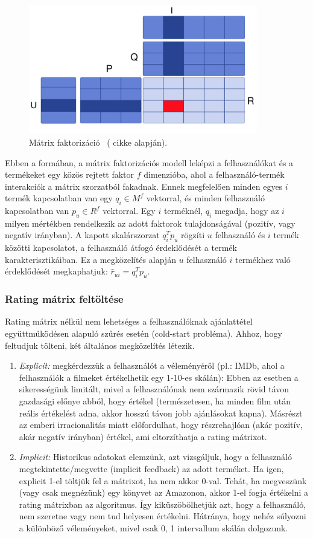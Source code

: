 \documentclass[a4paper,12pt]{article}
\begin{document}
\begin{figure}[ht!]
\centering
\includegraphics[width=100mm]{img/factor.png}
\caption{Mátrix faktorizáció ~(\cite{mf_databricks} cikke alapján).}
\end{figure}

Ebben a formában, a mátrix faktorizációs modell leképzi a felhasználókat és a termékeket egy közös rejtett faktor $f$ dimenzióba, ahol a felhasználó-termék interakciók a mátrix szorzatból fakadnak. Ennek megfelelően minden egyes $i$ termék kapcsolatban van egy $q_{i} \in M^f$ vektorral, és minden felhasználó kapcsolatban van $p_{u} \in R^f$ vektorral. Egy $i$ terméknél, $q_{i}$ megadja, hogy az $i$ milyen mértékben rendelkezik az adott faktorok tulajdonságával (pozitív, vagy negatív irányban). A kapott skalárszorzat $q_{i}^Tp_{u}$ rögzíti $u$ felhasználó és $i$ termék közötti kapcsolatot, a felhasználó átfogó érdeklődését a termék karakterisztikáiban. Ez a megközelítés alapján $u$ felhasználó $i$ termékhez való érdeklődését megkaphatjuk: 
$\hat{r}_{ui} = q_{i}^T p_{u}$.

\subsubsection{Rating mátrix feltöltése}
Rating mátrix nélkül nem lehetséges a felhasználóknak ajánlattétel együttműködésen alapuló szűrés esetén (cold-start probléma). Ahhoz, hogy feltudjuk tölteni, két általános megközelítés létezik.
\begin{enumerate}
\item \textsl{Explicit:} megkérdezzük a felhasználót a véleményéről (pl.: IMDb, ahol a felhasználók a filmeket értékelhetik egy 1-10-es skálán): Ebben az esetben a sikerességünk limitált, mivel a felhasználónak nem származik rövid távon gazdasági előnye abból, hogy értékel (természetesen, ha minden film után reális értékelést adna, akkor hosszú távon jobb ajánlásokat kapna). Másrészt az emberi irracionalitás miatt előfordulhat, hogy részrehajlóan (akár pozitív, akár negatív irányban) értékel, ami eltorzíthatja a rating mátrixot.~\parencite{introspection}
\item \textsl{Implicit:} Historikus adatokat elemzünk, azt vizsgáljuk, hogy a felhasználó megtekintette/megvette (implicit feedback) az adott terméket. Ha igen, explicit 1-el töltjük fel a mátrixot, ha nem akkor 0-val. Tehát, ha megveszünk (vagy csak megnézünk) egy könyvet az Amazonon, akkor 1-el fogja értékelni a rating mátrixban az algoritmus. Így kiküszöbölhetjük azt, hogy a felhasználó, nem szeretne vagy nem tud helyesen értékelni. Hátránya, hogy nehéz súlyozni a különböző véleményeket, mivel csak {0, 1} intervallum skálán dolgozunk.
\end{enumerate}
\end{document}

